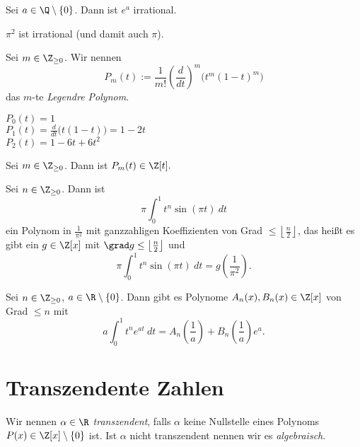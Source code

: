 \begin{thm}\autolabel
	Sei $a \in \Q \setminus \{0\}$. Dann ist $e^a$ irrational.
\end{thm}

\begin{thm}\autolabel
	$\pi^2$ ist irrational (und damit auch $\pi$).
\end{thm}

\begin{defn*} 
	Sei $m \in \Z_{\geq 0}$. Wir nennen
	\[ P_m(t) := \frac{1}{m!} \left( \frac{d}{dt} \right)^m \big( t^m (1-t)^m \big) \]
	das $m$-te \emph{Legendre Polynom}.
\end{defn*}

\begin{exmp*}
	$P_0(t)=1$\\
	$P_1(t) = \frac{d}{dt} \big( t(1-t) \big) = 1-2t$\\
	$P_2(t) = 1-6t+6t^2$
\end{exmp*}

\begin{lem}\autolabel
	Sei $m \in \Z_{\geq 0}$. Dann ist $P_m(t) \in \Z[t].$
\end{lem}

\begin{lem}\autolabel
	Sei $n \in \Z_{\geq 0}$. Dann ist
	\[ \pi \int_{0}^{1} t^n \sin(\pi t) \ dt \]
	ein Polynom in $\frac{1}{\pi^2}$ mit ganzzahligen Koeffizienten von Grad $\leq \left\lfloor \frac{n}{2} \right\rfloor$, das heißt es gibt ein $g \in \Z[x]$ mit \( \grad g \leq \left\lfloor \frac{n}{2} \right\rfloor \) und
	\[ \pi \int_{0}^{1} t^n \sin(\pi t) \ dt = g \left(\frac{1}{\pi^2}\right). \]
\end{lem}

\begin{lem*}
	Sei $n \in \Z_{\geq 0}$, $a \in \R\setminus\{0\}$. Dann gibt es Polynome $A_n(x), B_n(x) \in \Z[x]$ von Grad $\leq n$ mit
	\[ a \int_{0}^{1} t^n e^{at} \ dt = A_n \left( \frac{1}{a} \right) + B_n \left( \frac{1}{a} \right) e^a. \]
\end{lem*}

\section{Transzendente Zahlen}

\begin{defn*}
	Wir nennen $\alpha \in \R$ \emph{transzendent}, falls $\alpha$ keine Nullstelle eines Polynoms $P(x) \in \Z[x]\setminus\{0\}$ ist. Ist $\alpha$ nicht transzendent nennen wir es \emph{algebraisch}.
\end{defn*}

